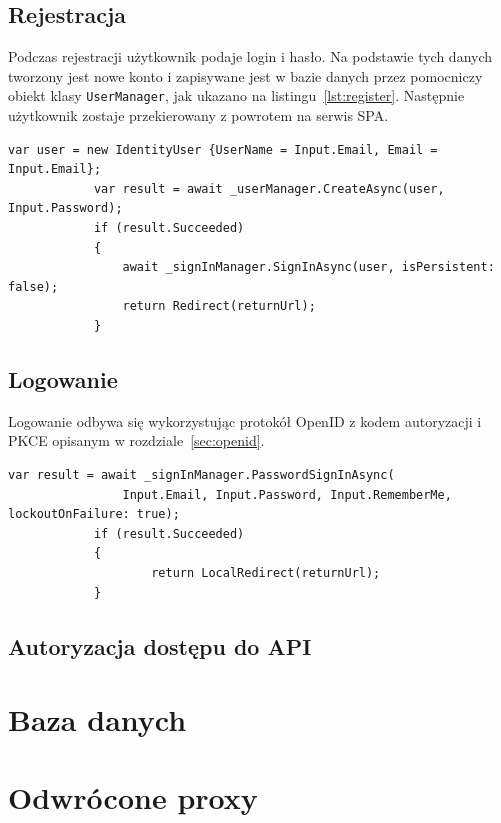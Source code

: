 	\subsection{Rejestracja}
		Podczas rejestracji użytkownik podaje login i hasło.
		Na podstawie tych danych tworzony jest nowe konto i zapisywane jest w bazie danych przez pomocniczy obiekt klasy \verb|UserManager|,
		jak ukazano na listingu~\ref{lst:register}.
		Następnie użytkownik zostaje przekierowany z powrotem na serwis SPA.

		\begin{lstlisting}[label=lst:register, caption=Fragment kodu rejestacji, float]
			var user = new IdentityUser {UserName = Input.Email, Email = Input.Email};
			var result = await _userManager.CreateAsync(user, Input.Password);
			if (result.Succeeded)
			{
				await _signInManager.SignInAsync(user, isPersistent: false);
				return Redirect(returnUrl);
			}
		\end{lstlisting}

	\subsection{Logowanie}
		Logowanie odbywa się wykorzystując protokół OpenID z kodem autoryzacji i PKCE opisanym w rozdziale~\ref{sec:openid}.
		
		\begin{lstlisting}[label=lst:login, caption=Fragment kodu logowania, float]
			var result = await _signInManager.PasswordSignInAsync(
				Input.Email, Input.Password, Input.RememberMe, lockoutOnFailure: true);
			if (result.Succeeded)
			{
					return LocalRedirect(returnUrl);
			}
		\end{lstlisting}



	\subsection{Autoryzacja dostępu do API}

\section{Baza danych}

\section{Odwrócone proxy}